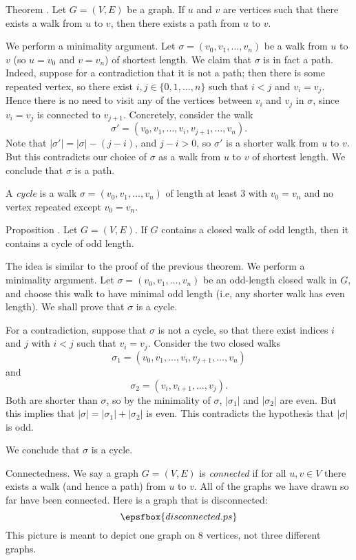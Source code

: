 \proclaim Theorem \advthm. Let $G = (V,E)$ be a graph. If $u$ and $v$ are vertices
such that there exists a walk from $u$ to $v$, then there exists a path from $u$ to $v$.

\proof We perform a minimality argument.
Let $\sigma = (v_0, v_1,\ldots, v_n)$ be a walk from $u$ to $v$ (so
$u = v_0$ and $v = v_n$) of shortest length. We claim that $\sigma$ is in fact a path.
Indeed, suppose for a contradiction that it is not a path; then there is some repeated vertex,
so there exist $i,j\in\{0,1,\ldots,n\}$ such that $i<j$ and $v_i = v_j$. Hence
there is no need to visit any of the vertices between $v_i$ and $v_j$ in $\sigma$,
since $v_i = v_j$ is connected to $v_{j+1}$. Concretely, consider the walk
$$\sigma' = (v_0, v_1,\ldots, v_i, v_{j+1}, \ldots, v_n).$$
Note that $|\sigma'| = |\sigma| - (j-i)$, and $j-i > 0$, so $\sigma'$ is a shorter walk
from $u$ to $v$. But this contradicts our choice of $\sigma$ as a walk from
$u$ to $v$ of shortest length. We conclude that $\sigma$ is a path.\slug

A {\it cycle} is a walk $\sigma = (v_0,v_1,\ldots,v_n)$ of length at least $3$
with $v_0 = v_n$ and no vertex repeated except $v_0 = v_n$.

\edef\propoddwalkoddcycle{\the\thmcount}
\proclaim Proposition \advthm. Let $G = (V,E)$. If $G$ contains a closed walk
of odd length, then it contains a cycle of odd length.

\proof The idea is similar to the proof of the previous theorem. We perform a
minimality argument. Let
$\sigma = (v_0, v_1,\ldots,v_n)$ be an odd-length closed walk in $G$, and choose
this walk to have minimal odd length (i.e, any shorter walk has even length). We shall
prove that $\sigma$ is a cycle.

For a contradiction, suppose that $\sigma$ is not a cycle, so that
there exist indices $i$ and $j$ with $i<j$ such that $v_i = v_j$.
Consider the two closed walks
$$\sigma_1 = (v_0, v_1, \ldots, v_i, v_{j+1}, \ldots, v_n)$$
and
$$\sigma_2 = (v_i, v_{i+1}, \ldots, v_j).$$
Both are shorter than $\sigma$, so by the minimality of $\sigma$,
$|\sigma_1|$ and $|\sigma_2|$ are even. But this implies that
$|\sigma| = |\sigma_1|+|\sigma_2|$ is even. This contradicts the hypothesis that $|\sigma|$
is odd.

We conclude that $\sigma$ is a cycle.\slug
\bye

\medskip\boldlabel Connectedness.
We say a graph $G = (V,E)$ is {\it connected} if for all $u,v\in V$ there exists
a walk (and hence a path) from $u$ to $v$. All of the graphs we have
drawn so far have been connected. Here is a graph that is disconnected:
\midinsert
$$\epsfbox{disconnected.ps}$$
\endinsert
\noindent This picture is meant to depict one graph on $8$ vertices, not three
different graphs.

